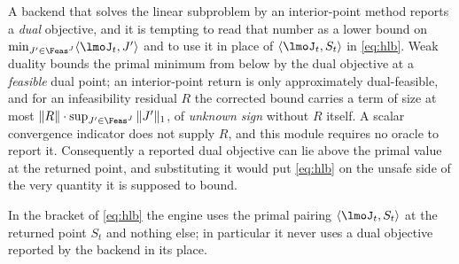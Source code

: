 
A backend that solves the linear subproblem by an interior-point method
reports a \emph{dual} objective, and it is tempting to read that number as a
lower bound on $\min_{J'\in\Feas^{J}}\langle\lmoJ_t,J'\rangle$ and to use it
in place of $\langle\lmoJ_t,S_t\rangle$ in \eqref{eq:hlb}. Weak duality
bounds the primal minimum from below by the dual objective at a
\emph{feasible} dual point; an interior-point return is only approximately
dual-feasible, and for an infeasibility residual $R$ the corrected bound
carries a term of size at most
$\|R\|\cdot\sup_{J'\in\Feas^{J}}\|J'\|_1$, of \emph{unknown sign} without
$R$ itself. A scalar convergence indicator does not supply $R$, and this
module requires no oracle to report it. Consequently a reported dual
objective can lie above the primal value at the returned point, and
substituting it would put \eqref{eq:hlb} on the unsafe side of the very
quantity it is supposed to bound.

\begin{requirement}\label{req:primal-pairing}
In the bracket of \eqref{eq:hlb} the engine uses the primal pairing
$\langle\lmoJ_t,S_t\rangle$ at the returned point $S_t$ and nothing else; in
particular it never uses a dual objective reported by the backend in its
place.
\end{requirement}
